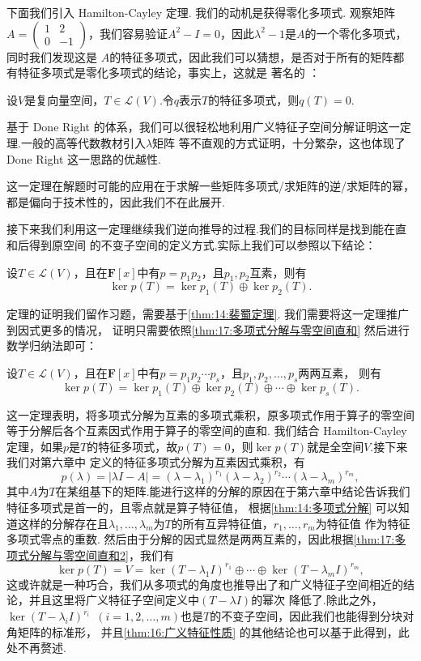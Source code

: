 下面我们引入 Hamilton-Cayley 定理. 我们的动机是获得零化多项式. 观察矩阵$A=\begin{pmatrix}
    1 & 2 \\ 0 & -1
\end{pmatrix}$，我们容易验证$A^2-I=0$，因此$\lambda^2-1$是$A$的一个零化多项式，同时我们发现这是
$A$的特征多项式，因此我们可以猜想，是否对于所有的矩阵都有特征多项式是零化多项式的结论，事实上，这就是
著名的 ：
\begin{theorem} \label{thm:17:HC}
    设$V$是复向量空间，$T\in \mathcal{L}(V)$.令$q$表示$T$的特征多项式，则$q(T)=0$.
\end{theorem}
基于 Done Right 的体系，我们可以很轻松地利用广义特征子空间分解证明这一定理.一般的高等代数教材引入$\lambda$矩阵
等不直观的方式证明，十分繁杂，这也体现了 Done Right 这一思路的优越性.

这一定理在解题时可能的应用在于求解一些矩阵多项式/求矩阵的逆/求矩阵的幂，都是偏向于技术性的，因此我们不在此展开.

接下来我们利用这一定理继续我们逆向推导的过程.我们的目标同样是找到能在直和后得到原空间
的不变子空间的定义方式.实际上我们可以参照以下结论：
\begin{theorem} \label{thm:17:多项式分解与零空间直和}
    设$T\in \mathcal{L}(V)$，且在$\mathbf{F}[x]$中有$p=p_1p_2$，且$p_1,p_2$互素，则有
    \[\ker p(T)=\ker p_1(T)\oplus\ker p_2(T).\]
\end{theorem}
定理的证明我们留作习题，需要基于\autoref{thm:14:裴蜀定理}. 我们需要将这一定理推广到因式更多的情况，
证明只需要依照\autoref{thm:17:多项式分解与零空间直和} 然后进行数学归纳法即可：
\begin{theorem} \label{thm:17:多项式分解与零空间直和2}
    设$T\in \mathcal{L}(V)$，且在$\mathbf{F}[x]$中有$p=p_1p_2\cdots p_s$，且$p_1,p_2,\ldots,p_s$两两互素，
    则有\[\ker p(T)=\ker p_1(T)\oplus\ker p_2(T)\oplus\cdots\oplus\ker p_s(T).\]
\end{theorem}
这一定理表明，将多项式分解为互素的多项式乘积，原多项式作用于算子的零空间等于分解后各个互素因式作用于算子的零空间的直和.
我们结合 Hamilton-Cayley 定理，如果$p$是$T$的特征多项式，故$p(T)=0$，则$\ker p(T)$就是全空间$V$.接下来我们对第六章中
定义的特征多项式分解为互素因式乘积，有
\[p(\lambda)=|\lambda I-A|=(\lambda-\lambda_1)^{r_1}(\lambda-\lambda_2)^{r_2}\cdots(\lambda-\lambda_m)^{r_m},\]
其中$A$为$T$在某组基下的矩阵.能进行这样的分解的原因在于第六章中结论告诉我们特征多项式是首一的，且零点就是算子特征值，
根据\autoref{thm:14:多项式分解} 可以知道这样的分解存在且$\lambda_1,\ldots,\lambda_m$为$T$的所有互异特征值，$r_1,\ldots,r_m$为特征值
作为特征多项式零点的重数. 然后由于分解的因式显然是两两互素的，因此根据\autoref{thm:17:多项式分解与零空间直和2}，我们有
\[\ker p(T)=V=\ker (T-\lambda_1I)^{r_1}\oplus\cdots\oplus\ker (T-\lambda_mI)^{r_m},\]
这或许就是一种巧合，我们从多项式的角度也推导出了和广义特征子空间相近的结论，并且这里将广义特征子空间定义中$(T-\lambda I)$的幂次
降低了.除此之外，$\ker (T-\lambda_iI)^{r_i}\enspace(i=1,2,\ldots,m)$也是$T$的不变子空间，因此我们也能得到分块对角矩阵的标准形，
并且\autoref{thm:16:广义特征性质} 的其他结论也可以基于此得到，此处不再赘述.

